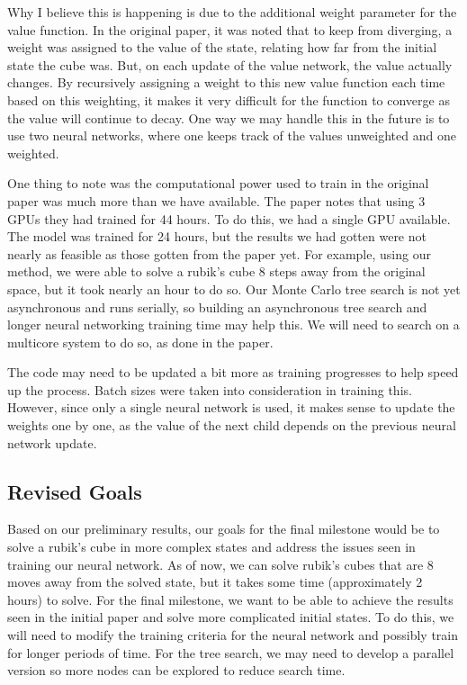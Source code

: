\documentclass[10pt,twocolumn,letterpaper]{article}
\begin{document}
Why I believe this is happening is due to the additional weight parameter for the value function. In the original paper, it was noted that to keep from diverging, a weight was assigned to the value of the state, relating how far from the initial state the cube was. But, on each update of the value network, the value actually changes. By recursively assigning a weight to this new value function each time based on this weighting, it makes it very difficult for the function to converge as the value will continue to decay. One way we may handle this in the future is to use two neural networks, where one keeps track of the values unweighted and one weighted. 

One thing to note was the computational power used to train in the original paper was much more than we have available. The paper notes that using 3 GPUs they had trained for 44 hours. To do this, we had a single GPU available. The model was trained for 24 hours, but the results we had gotten were not nearly as feasible as those gotten from the paper yet. For example, using our method, we were able to solve a rubik's cube 8 steps away from the original space, but it took nearly an hour to do so. Our Monte Carlo tree search is not yet asynchronous and runs serially, so building an asynchronous tree search and longer neural networking training time may help this. We will need to search on a multicore system to do so, as done in the paper.

The code may need to be updated a bit more as training progresses to help speed up the process. Batch sizes were taken into consideration in training this. However, since only a single neural network is used, it makes sense to update the weights one by one, as the value of the next child depends on the previous neural network update.

\subsection{Revised Goals}

Based on our preliminary results, our goals for the final milestone would be to solve a rubik's cube in more complex states and address the issues seen in training our neural network. As of now, we can solve rubik's cubes that are 8 moves away from the solved state, but it takes some time (approximately 2 hours) to solve. For the final milestone, we want to be able to achieve the results seen in the initial paper and solve more complicated initial states. To do this, we will need to modify the training criteria for the neural network and possibly train for longer periods of time. For the tree search, we may need to develop a parallel version so more nodes can be explored to reduce search time. 
\end{document}
